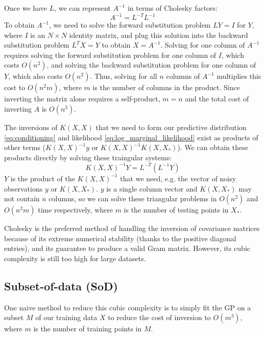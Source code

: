 Once we have $L$, we can represent $A^{-1}$ in terms of Cholesky factors: 
\begin{equation*}
    A^{-1} = L^{-T} L^{-1}
\end{equation*}
To obtain $A^{-1}$, we need to solve the forward substitution problem $LY = I$ for $Y$, where $I$ is an $N \times N$ identity matrix, and plug this solution into the backward substitution problem $L^TX = Y$ to obtain $X = A^{-1}$. Solving for one column of $A^{-1}$ requires solving the forward substitution problem for one column of $I$, which costs $O(n^2)$, and solving the backward substitution problem for one column of $Y$, which also costs $O(n^2)$. Thus, solving for all $n$ columns of $A^{-1}$ multiplies this cost to $O(n^2m)$, where $m$ is the number of columns in the product. Since inverting the matrix alone requires a self-product, $m = n$ and the total cost of inverting $A$ is $O(n^3)$.

The inversions of $K(X, X)$ that we need to form our predictive distribution \ref{eq:conditioning} and likelihood \ref{eq:log_marginal_likelihood} exist as products of other terms ($K(X,X)^{-1} y$ or $K(X,X)^{-1} K(X, X_*)$). We can obtain these products directly by solving these traingular systems:
\begin{equation*}
    K(X, X)^{-1} Y = L^{-T} (L^{-1} Y)
\end{equation*}
$Y$ is the product of the $K(X, X)^{-1}$ that we need, e.g. the vector of noisy observations $y$ or $K(X, X_*)$. $y$ is a single column vector and $K(X, X_*)$ may not contain $n$ columns, so we can solve these triangular problems in $O(n^2)$ and $O(n^2m)$ time respectively, where $m$ is the number of testing points in $X_*$.

Cholesky is the preferred method of handling the inversion of covariance matrices because of its extreme numerical stability (thanks to the positive diagonal entries), and its guarantee to produce a valid Gram matrix. However, its cubic complexity is still too high for large datasets.

\subsection{Subset-of-data (SoD)}
One naive method to reduce this cubic complexity is to simply fit the GP on a subset $M$ of our training data $X$ to reduce the cost of inversion to $O(m^3)$, where $m$ is the number of training points in $M$. 

